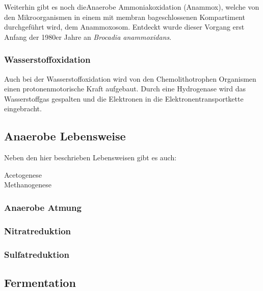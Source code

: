 Weiterhin gibt es noch dieAnaerobe Ammoniakoxidation (Anammox),
welche von den Mikroorganismen in einem mit membran bageschlossenen Kompartiment 
durchgeführt wird,
dem Anammoxosom.
Entdeckt wurde dieser Vorgang erst Anfang der 1980er Jahre an \emph{Brocadia anammoxidans}.
\\

\subsubsection{Wasserstoffoxidation}
Auch bei der Wasserstoffoxidation wird von den Chemolithotrophen Organismen
einen protonenmotorische Kraft aufgebaut.
Durch eine Hydrogenase wird das Wasserstoffgas gespalten
und die Elektronen in die Elektronentransportkette eingebracht.

\subsection{Anaerobe Lebensweise}
Neben den hier beschrieben Lebensweisen gibt es auch:
\begin{description}
	\item[Acetogenese]
	\item[Methanogenese]
\end{description}

\subsubsection{Anaerobe Atmung}
\subsubsection{Nitratreduktion}
\subsubsection{Sulfatreduktion}

\subsection{Fermentation}
